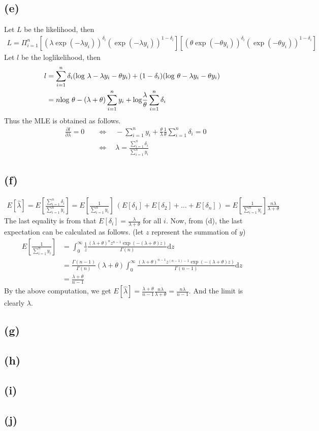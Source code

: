 \documentclass{article}
\begin{document}
\subsection{(e)}
Let $L$ be the likelihood, then
\begin{align*}
	L = \Pi_{i=1}^n \left[ (\lambda \exp(-\lambda y_i))^{\delta_i} (\exp(-\lambda y_i))^{1-\delta_i} \right] \left[ (\theta \exp(-\theta y_i))^{\delta_i} (\exp(-\theta y_i))^{1-\delta_i} \right]
\end{align*}
Let $l$ be the loglikelihood, then
\begin{align*}
	l &= \sum_{i=1}^n \delta_i ({\rm log}\ \lambda - \lambda y_i - \theta y_i) + (1 - \delta_i) ({\rm log}\ \theta - \lambda y_i - \theta y_i)\\
	&= n {\rm log}\ \theta - (\lambda+\theta) \sum_{i=1}^n y_i + {\rm log} \frac{\lambda}{\theta} \sum_{i=1}^n \delta_i
\end{align*}
Thus the MLE is obtained as follows.
\begin{align*}
	\quad \frac{\partial l}{\partial \lambda} = 0 &\quad \Leftrightarrow \quad -\sum_{i=1}^n y_i + \frac{\theta}{\lambda} \frac{1}{\theta} \sum_{i=1}^n \delta_i = 0 \\[10pt]
	&\quad \Leftrightarrow \quad \lambda = \frac{\sum_{i=1}^n \delta_i}{\sum_{i=1}^n y_i}
\end{align*}

\subsection{(f)}
\begin{align*}
	E[\hat{\lambda}] = E\left[ \frac{\sum_{i=1}^n \delta_i }{\sum_{i=1}^n y_i} \right] = E\left[\frac{1}{\sum_{i=1}^n y_i} \right]\ (E[\delta_1] + E[\delta_2] + \dots + E[\delta_n]) = E\left[\frac{1}{\sum_{i=1}^n y_i} \right] \frac{n\lambda}{\lambda + \theta}
\end{align*}
The last equality is from that $E[\delta_i] = \frac{\lambda}{\lambda+\theta}$ for all $i$. Now, from (d), the last expectation can be calculated as follows. (let $z$ represent the summation of $y$)
\begin{align*}
	E\left[\frac{1}{\sum_{i=1}^n y_i} \right] &= \int_0^{\infty} \frac{1}{z} \frac{(\lambda+\theta)^n z^{n-1} \exp(-(\lambda+\theta)z)}{\Gamma(n)} \mathrm{d}z\\[10pt]
	&= \frac{\Gamma(n-1)}{\Gamma(n)} (\lambda+\theta) \int_0^{\infty} \frac{(\lambda+\theta)^{n-1} z^{(n-1) -1} \exp(-(\lambda+\theta)z)}{\Gamma(n-1)} \mathrm{d}z\\[10pt]
	&= \frac{\lambda+\theta}{n-1}
\end{align*}
By the above computation, we get $E[\hat{\lambda}] = \frac{\lambda+\theta}{n-1} \frac{n\lambda}{\lambda+\theta} = \frac{n\lambda}{n-1}$. And the limit is clearly $\lambda$.

\subsection{(g)}


\subsection{(h)}
\subsection{(i)}
\subsection{(j)}
\end{document}
